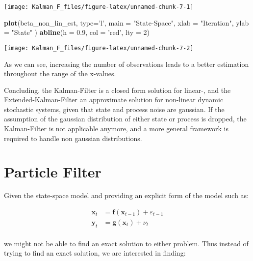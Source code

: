 \documentclass[
]{article}
\newenvironment{Shaded}{\begin{snugshade}}{\end{snugshade}}
\newcommand{\DataTypeTok}[1]{\textcolor[rgb]{0.13,0.29,0.53}{#1}}
\newcommand{\DecValTok}[1]{\textcolor[rgb]{0.00,0.00,0.81}{#1}}
\newcommand{\FloatTok}[1]{\textcolor[rgb]{0.00,0.00,0.81}{#1}}
\newcommand{\KeywordTok}[1]{\textcolor[rgb]{0.13,0.29,0.53}{\textbf{#1}}}
\newcommand{\NormalTok}[1]{#1}
\newcommand{\StringTok}[1]{\textcolor[rgb]{0.31,0.60,0.02}{#1}}
\begin{document}
\begin{center}\texttt{[image: Kalman\_F\_files/figure-latex/unnamed-chunk-7-1]} \end{center}

\begin{Shaded}
\begin{Highlighting}[]
\KeywordTok{plot}\NormalTok{(beta_non_lin_est, }\DataTypeTok{type=}\StringTok{'l'}\NormalTok{,}
 \DataTypeTok{main =} \StringTok{"State-Space"}\NormalTok{,}
 \DataTypeTok{xlab =} \StringTok{"Iteration"}\NormalTok{,}
 \DataTypeTok{ylab =} \StringTok{"State"}
\NormalTok{)}
\KeywordTok{abline}\NormalTok{(}\DataTypeTok{h =} \FloatTok{0.9}\NormalTok{, }\DataTypeTok{col =} \StringTok{'red'}\NormalTok{, }\DataTypeTok{lty =} \DecValTok{2}\NormalTok{)}
\end{Highlighting}
\end{Shaded}

\begin{center}\texttt{[image: Kalman\_F\_files/figure-latex/unnamed-chunk-7-2]} \end{center}

As we can see, increasing the number of observations leads to a better
estimation throughout the range of the x-values.

Concluding, the Kalman-Filter is a closed form solution for linear-, and
the Extended-Kalman-Filter an approximate solution for non-linear
dynamic stochastic systems, given that state and process noise are
gaussian. If the assumption of the gaussian distribution of either state
or process is dropped, the Kalman-Filter is not applicable anymore, and
a more general framework is required to handle non gaussian
distributions.

\hypertarget{particle-filter}{%
\section{Particle Filter}\label{particle-filter}}

Given the state-space model and providing an explicit form of the model
such as:

\[
\begin{align*}
    \textbf{x}_t &= \textbf{f}(\textbf{x}_{t-1}) + \varepsilon_{t-1} \\
    \textbf{y}_t &= \textbf{g}(\textbf{x}_{t}) + \nu_t \\
\end{align*}
\]

we might not be able to find an exact solution to either problem. Thus
instead of trying to find an exact solution, we are interested in
finding:
\end{document}
